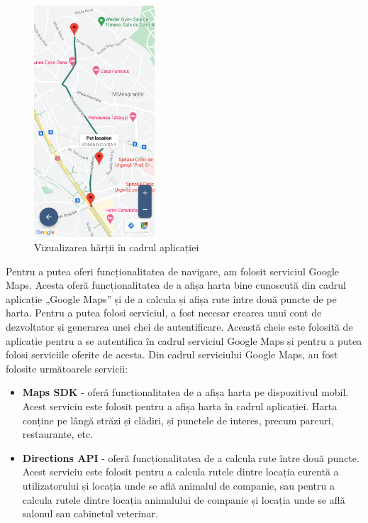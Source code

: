 \begin{figure}
    \centering
    \includegraphics[width=0.4\textwidth]{images/application_map_view.png}
    \caption{Vizualizarea hărții în cadrul aplicației}
    \label{fig:application_map_view}
\end{figure}

Pentru a putea oferi funcționalitatea de navigare, am folosit serviciul Google Maps. Acesta oferă funcționalitatea de a afișa harta bine cunoscută din cadrul aplicație „Google Maps” și de a calcula și afișa rute între două puncte de pe harta. Pentru a putea folosi serviciul, a fost necesar crearea unui cont de dezvoltator și generarea unei chei de autentificare. Această cheie este folosită de aplicație pentru a se autentifica în cadrul serviciul Google Maps și pentru a putea folosi serviciile oferite de acesta. 
Din cadrul serviciului Google Maps, au fost folosite următoarele servicii:

\begin{itemize}
    \item \textbf{Maps SDK} - 
    oferă funcționalitatea de a afișa harta pe dispozitivul mobil. Acest serviciu este folosit pentru a afișa harta în cadrul aplicației. Harta conține pe lângă străzi și clădiri, și punctele de interes, precum parcuri, restaurante, etc.    
    \item \textbf{Directions API} - oferă funcționalitatea de a calcula rute între două puncte. Acest serviciu este folosit pentru a calcula rutele dintre locația curentă a utilizatorului și locația unde se află animalul de companie, sau pentru a calcula rutele dintre locația animalului de companie și locația unde se află salonul sau cabinetul veterinar.
\end{itemize}

